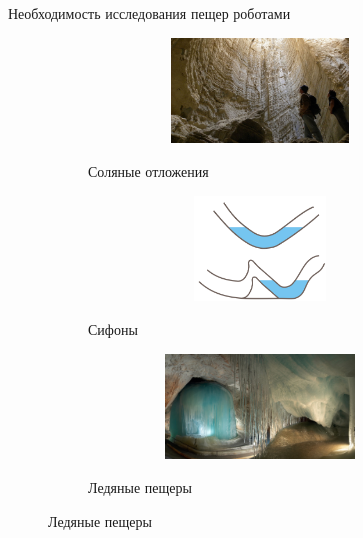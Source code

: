 \documentclass[aspectratio=169,xcolor=table]{beamer}
\begin{document}
\begin{frame}[t]{Необходимость исследования пещер роботами}
    \vspace{-0.85cm}
    \begin{figure}[H]
        \begin{subfigure}[b]{0.3\textwidth}
            \centering\includegraphics[height=2.8cm,width=1\textwidth,keepaspectratio]{surface_types/salt.jpg}\\
            \caption*{Соляные отложения}
            \label{fig:surface_types/salt}
        \end{subfigure}
        \hfill
        \begin{subfigure}[b]{0.3\textwidth}
            \centering\includegraphics[height=2.8cm,width=1\textwidth,keepaspectratio]{surface_types/siphon.png}\\
            \caption*{Сифоны}
            \label{fig:surface_types/siphon}
        \end{subfigure}
        \hfill
        \begin{subfigure}[b]{0.3\textwidth}
            \centering\includegraphics[height=2.8cm,width=1\textwidth,keepaspectratio]{surface_types/ice.png}\\
            \caption*{Ледяные пещеры}
            \label{fig:surface_types/ice}
        \end{subfigure}


\end{figure}
\end{frame}
\end{document}
